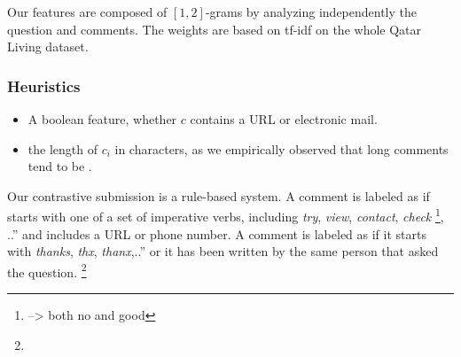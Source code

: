 Our features are composed of $[1,2]$-grams by analyzing independently the 
question and comments. The weights are based on tf-idf on the whole Qatar 
Living 
dataset. 

\subsubsection{Heuristics}
\label{ssub:heuristics}

\begin{itemize}
 \item A boolean feature, whether $c$ contains a URL or electronic mail. 
 \item the length of $c_i$ in characters, as we empirically observed that long 
  comments tend to be \good.
\end{itemize}


Our contrastive submission  is a rule-based system. A comment is 
labeled as \good if starts with one of a set of imperative verbs, including 
\textit{try}, \textit{view}, \textit{contact}, \textit{check}%
\footnote{
 --> both no and good


% 
% 


}, ..” and includes a URL or phone number. A comment is labeled 
as \dial if it starts with \textit{thanks}, \textit{thx}, \textit{thanx},..” 
or it has been written by the same person that asked the question.%
\footnote{}



